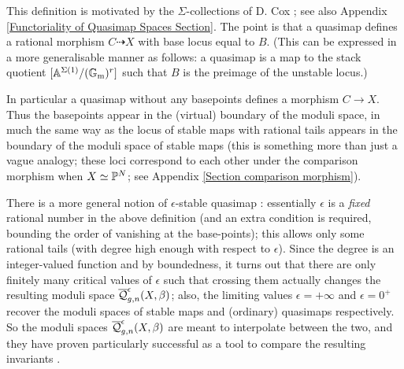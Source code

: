 \begin{remark} This definition is motivated by the $\Sigma$-collections of D. Cox \cite{CoxFunctor}; see also Appendix \ref{Functoriality of Quasimap Spaces Section}. The point is that a quasimap defines a rational morphism $C \dashrightarrow X$ with base locus equal to $B$. (This can be expressed in a more generalisable manner as follows: a quasimap is a map to the stack quotient $[\mathbb{A}^{\Sigma(1)} / (\mathbb{G}_{\text{m}})^r]$ such that $B$ is the preimage of the unstable locus.)

In particular a quasimap without any basepoints defines a morphism $C \to X$. Thus the basepoints appear in the (virtual) boundary of the moduli space, in much the same way as the locus of stable maps with rational tails appears in the boundary of the moduli space of stable maps (this is something more than just a vague analogy; these loci correspond to each other under the comparison morphism when $X\simeq\mathbb P^N$; see Appendix \ref{Section comparison morphism}). \end{remark}

\begin{remark}
 There is a more general notion of $\epsilon$-stable quasimap \cite[\S 7.1]{CFKM}: essentially $\epsilon$ is a \emph{fixed} rational number in the above definition (and an extra condition is required, bounding the order of vanishing at the base-points); this allows only some rational tails (with degree high enough with respect to $\epsilon$). Since the degree is an integer-valued function and by boundedness, it turns out that there are only finitely many critical values of $\epsilon$ such that crossing them actually changes the resulting moduli space $\overline{\mathcal Q}^{\epsilon}_{g,n}(X,\beta)$; also, the limiting values $\epsilon=+\infty$ and $\epsilon=0^+$ recover the moduli spaces of stable maps and (ordinary) quasimaps respectively. So the moduli spaces $\overline{\mathcal Q}^{\epsilon}_{g,n}(X,\beta)$ are meant to interpolate between the two, and they have proven particularly successful as a tool to compare the resulting invariants \cite{CF-K-wallcrossing}.
\end{remark}

